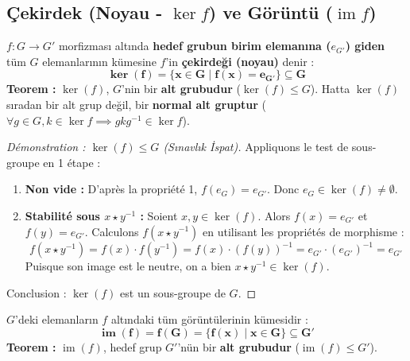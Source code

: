 \documentclass[12pt,a4paper]{report}
\begin{document}
\vspace{0.4cm}

\subsection*{Çekirdek (Noyau - $\ker f$) ve Görüntü ($\operatorname{im} f$)}

\begin{tcolorbox}[colback=red!5!white,colframe=red!75!black,title=Çekirdek Tanımı ve Özellikleri (Le Noyau - $\ker f$)]
$f : G \to G'$ morfizması altında \textbf{hedef grubun birim elemanına ($e_{G'}$) giden} tüm $G$ elemanlarının kümesine $f$'in \textbf{çekirdeği (noyau)} denir :
\[ \mathbf{\ker(f) = \{ x \in G \mid f(x) = e_{G'} \} \subseteq G} \]
\textbf{Teorem :} $\ker(f)$, $G$'nin bir \textbf{alt grubudur} ($\ker(f) \leq G$).  
Hatta $\ker(f)$ sıradan bir alt grup değil, bir \textbf{normal alt gruptur} ($\forall g \in G, k \in \ker f \implies gkg^{-1} \in \ker f$).
\end{tcolorbox}

\begin{proof}[Démonstration : $\ker(f) \leq G$ (Sınavlık İspat)]
Appliquons le test de sous-groupe en 1 étape :
\begin{enumerate}
    \item \textbf{Non vide :} D'après la propriété 1, $f(e_G) = e_{G'}$. Donc $e_G \in \ker(f) \neq \emptyset$.
    \item \textbf{Stabilité sous $x \star y^{-1}$ :} Soient $x, y \in \ker(f)$. Alors $f(x) = e_{G'}$ et $f(y) = e_{G'}$.  
    Calculons $f(x \star y^{-1})$ en utilisant les propriétés de morphisme :
    \[ f(x \star y^{-1}) = f(x) \cdot f(y^{-1}) = f(x) \cdot (f(y))^{-1} = e_{G'} \cdot (e_{G'})^{-1} = e_{G'} \]
    Puisque son image est le neutre, on a bien $x \star y^{-1} \in \ker(f)$.
\end{enumerate}
Conclusion : $\ker(f)$ est un sous-groupe de $G$.
\end{proof}

\vspace{0.4cm}

\begin{tcolorbox}[colback=green!5!white,colframe=green!60!black,title=Görüntü Kümesi (L'Image - $\operatorname{im} f$)]
$G$'deki elemanların $f$ altındaki tüm görüntülerinin kümesidir :
\[ \mathbf{\operatorname{im}(f) = f(G) = \{ f(x) \mid x \in G \} \subseteq G'} \]
\textbf{Teorem :} $\operatorname{im}(f)$, hedef grup $G'$'nün bir \textbf{alt grubudur} ($\operatorname{im}(f) \leq G'$).
\end{tcolorbox}
\end{document}
